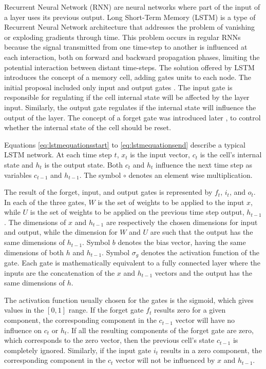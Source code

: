 Recurrent Neural Network (RNN) are neural networks where part of the input of a layer uses its previous output.
Long Short-Term Memory \cite{hochreiter_long_1997} (LSTM) is a type of Recurrent Neural Network architecture that addresses the problem of vanishing or exploding gradients through time. This problem occurs in regular RNNs because the signal transmitted from one time-step to another is influenced at each interaction, both on forward and backward propagation phases, limiting the potential interaction between distant time-steps. The solution offered by LSTM introduces the concept of a memory cell, adding gates units to each node. The initial proposal included only input and output gates \cite{hochreiter_long_1997}.
The input gate is responsible for regulating if the cell internal state will be affected by the layer input. Similarly, the output gate regulates if the internal state will influence the output of the layer. The concept of a forget gate was introduced later \cite{gers_learning_2000}, to control whether the internal state of the cell should be reset.

Equations \ref{eq:lstmequationsstart} to \ref{eq:lstmequationsend} describe a typical LSTM network. At each time step $t$, $x_t$ is the input vector, $c_t$ is the cell's internal state and $h_t$ is the output state. Both $c_t$ and $h_t$ influence the next time step as variables $c_{t-1}$ and $h_{t-1}$. The symbol $\circ$ denotes an element wise multiplication.

The result of the forget, input, and output gates is represented by $f_t$, $i_t$, and $o_t$.
In each of the three gates, $W$ is the set of weights to be applied to the input $x$, while $U$ is the set of weights to be applied on the previous time step output, $h_{t-1}$. 
The dimensions of $x$ and $h_{t-1}$ are respectively the chosen dimensions for input and output, while the dimension for $W$ and $U$ are such that the output has the same dimensions of $h_{t-1}$.  Symbol $b$ denotes the bias vector, having the same dimensions of both $h$ and $h_{t-1}$. Symbol $\sigma_g$ denotes the activation function of the gate. Each gate is mathematically equivalent to a fully connected layer where the inputs are the concatenation of the $x$ and $h_{t-1}$ vectors and the output has the same dimensions of $h$.

The activation function usually chosen for the gates is the sigmoid, which gives values in the $[0,1]$ range. If the forget gate $f_t$ results zero for a given component, the corresponding component in the $c_{t-1}$ vector will have no influence on $c_t$ or $h_t$. If all the resulting components of the forget gate are zero, which corresponds to the zero vector, then the previous cell's state $c_{t-1}$ is completely ignored.
Similarly, if the input gate $i_t$ results in a zero component, the corresponding component in the $c_t$ vector will not be influenced by $x$ and $h_{t-1}$.

